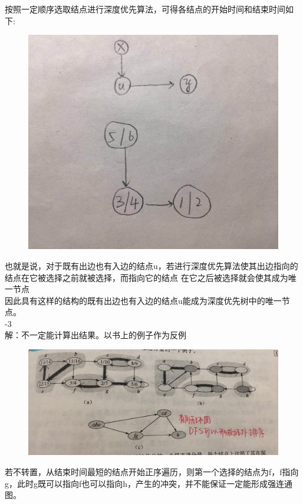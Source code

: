 \documentclass[19pt,a4paper]{article}
\begin{document}
\indent 按照一定顺序选取结点进行深度优先算法，可得各结点的开始时间和结束时间如下:
\begin{figure}[H]
\centering
\includegraphics[scale=0.2]{92.jpeg}
\end{figure}
\indent 也就是说，对于既有出边也有入边的结点u，若进行深度优先算法使其出边指向的结点在它被选择之前就被选择，而指向它的结点
在它之后被选择就会使其成为唯一节点\\
\indent 因此具有这样的结构的既有出边也有入边的结点u能成为深度优先树中的唯一节点。\\
-3\\
\indent 解：不一定能计算出结果。以书上的例子作为反例
\begin{figure}[H]
\centering
\includegraphics[scale=0.2]{93.jpeg}
\end{figure}
\indent 若不转置，从结束时间最短的结点开始正序遍历，则第一个选择的结点为f，f指向g，此时g既可以指向f也可以指向h，产生的冲突，并不能保证一定能形成强连通图。
\end{document}
